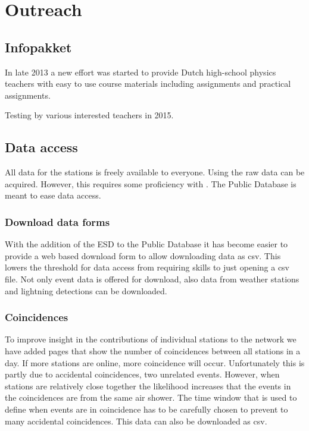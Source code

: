 \chapter{Outreach}
\label{ch:outreach}

\section{Infopakket}

In late 2013 a new effort was started to provide Dutch high-school
physics teachers with easy to use course materials including assignments
and practical assignments.

Testing by various interested teachers in 2015.


\section{Data access}

All data for the \hisparc stations is freely available to everyone.
Using \sapphire the raw data can be acquired. However, this requires
some proficiency with \python. The Public Database is meant to ease data
access.


\subsection{Download data forms}

With the addition of the ESD to the Public Database it has become easier
to provide a web based download form to allow downloading data as csv.
This lowers the threshold for data access from requiring \python skills
to just opening a csv file. Not only \hisparc event data is offered for
download, also data from \hisparc weather stations and \knmi lightning
detections can be downloaded.


\subsection{Coincidences}

To improve insight in the contributions of individual stations to the
\hisparc network we have added pages that show the number of
coincidences between all \hisparc stations in a day. If more stations
are online, more coincidence will occur. Unfortunately this is partly
due to accidental coincidences, two unrelated events. However, when
stations are relatively close together the likelihood increases that the
events in the coincidences are from the same air shower. The time window
that is used to define when events are in coincidence has to be
carefully chosen to prevent to many accidental coincidences. This data
can also be downloaded as csv.


